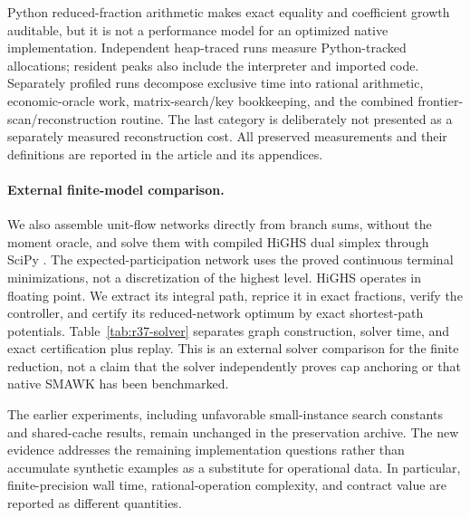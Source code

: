 

Python reduced-fraction arithmetic makes exact equality and coefficient growth auditable, but it is not a performance model for an optimized native implementation. Independent heap-traced runs measure Python-tracked allocations; resident peaks also include the interpreter and imported code. Separately profiled runs decompose exclusive time into rational arithmetic, economic-oracle work, matrix-search/key bookkeeping, and the combined frontier-scan/reconstruction routine. The last category is deliberately not presented as a separately measured reconstruction cost. All preserved measurements and their definitions are reported in the article and its appendices.

\paragraph{External finite-model comparison.}
We also assemble unit-flow networks directly from branch sums, without the moment oracle, and solve them with compiled HiGHS dual simplex through SciPy \citep{HuangfuHall2018,Virtanen2020}. The expected-participation network uses the proved continuous terminal minimizations, not a discretization of the highest level. HiGHS operates in floating point. We extract its integral path, reprice it in exact fractions, verify the controller, and certify its reduced-network optimum by exact shortest-path potentials. Table~\ref{tab:r37-solver} separates graph construction, solver time, and exact certification plus replay. This is an external solver comparison for the finite reduction, not a claim that the solver independently proves cap anchoring or that native SMAWK has been benchmarked.

The earlier experiments, including unfavorable small-instance search constants and shared-cache results, remain unchanged in the preservation archive. The new evidence addresses the remaining implementation questions rather than accumulate synthetic examples as a substitute for operational data. In particular, finite-precision wall time, rational-operation complexity, and contract value are reported as different quantities.
